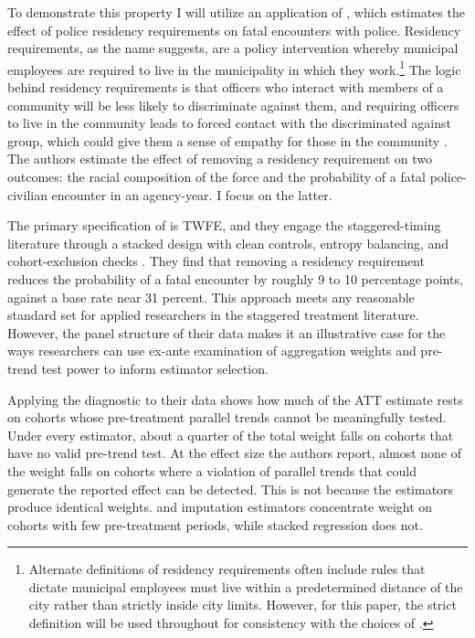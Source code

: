 \documentclass[12pt]{article}
\begin{document}
To demonstrate this property I will utilize an application of \textcite{payson2025residency}, which estimates the effect of police residency requirements on fatal encounters with police. Residency requirements, as the name suggests, are a policy intervention whereby municipal employees are required to live in the municipality in which they work.\footnote{Alternate definitions of residency requirements often include rules that dictate municipal employees must live within a predetermined distance of the city rather than strictly inside city limits. However, for this paper, the strict definition will be used throughout for consistency with the choices of \textcite{payson2025residency}.} The logic behind residency requirements is that officers who interact with members of a community will be less likely to discriminate against them, and requiring officers to live in the community leads to forced contact with the discriminated against group, which could give them a sense of empathy for those in the community \parencite{hopkins_politicized_2010, pettigrew_recent_2011, hubert_social_2022}. The authors estimate the effect of removing a residency requirement on two outcomes: the racial composition of the force and the probability of a fatal police-civilian encounter in an agency-year. I focus on the latter. 

The primary specification of \textcite{payson2025residency} is TWFE, and they engage the staggered-timing literature through a stacked design with clean controls, entropy balancing, and cohort-exclusion checks \parencite{cengiz2019effect}. They find that removing a residency requirement reduces the probability of a fatal encounter by roughly 9 to 10 percentage points, against a base rate near 31 percent. This approach meets any reasonable standard set for applied researchers in the staggered treatment literature. However, the panel structure of their data makes it an illustrative case for the ways researchers can use ex-ante examination of aggregation weights and pre-trend test power to inform estimator selection.

Applying the diagnostic to their data shows how much of the ATT estimate rests on cohorts whose pre-treatment parallel trends cannot be meaningfully tested. Under every estimator, about a quarter of the total weight falls on cohorts that have no valid pre-trend test. At the effect size the authors report, almost none of the weight falls on cohorts where a violation of parallel trends that could generate the reported effect can be detected. This is not because the estimators produce identical weights. \textcite{callaway2021difference} and imputation estimators \parencite[e.g.,][]{borusyak2024revisiting} concentrate weight on cohorts with few pre-treatment periods, while stacked regression does not.
\end{document}
